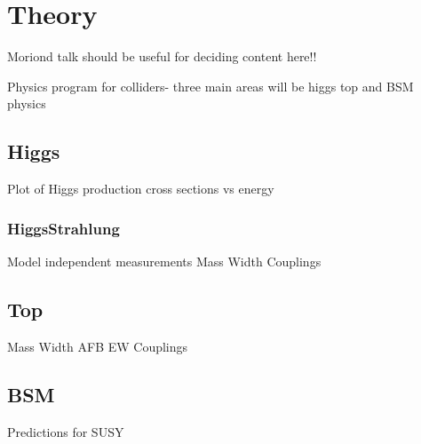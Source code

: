 \chapter{Theory}

Moriond talk should be useful for deciding content here!!

Physics program for colliders- three main areas will be higgs top and BSM physics

\section{Higgs}

Plot of Higgs production cross sections vs energy

\subsection{HiggsStrahlung}
Model independent measurements
Mass
Width
Couplings

\section{Top}
Mass
Width
AFB
EW Couplings


\section{BSM}
Predictions for SUSY